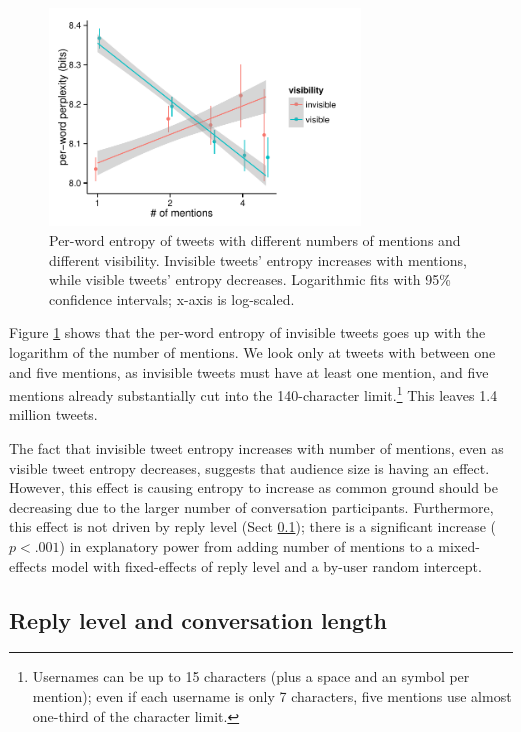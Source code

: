 \documentclass[11pt,letterpaper]{article}
\begin{document}
\begin{figure}[t]
 \centering
  \includegraphics[width=3.25in]{figures/cmcl-mentions-pw2.pdf}
 \caption{Per-word entropy of tweets with different numbers of mentions and different visibility.  Invisible tweets' entropy increases with mentions, while visible tweets' entropy decreases. Logarithmic fits with 95\% confidence intervals; x-axis is log-scaled.}\label{fig:mentions}\vspace*{-.5em}
\end{figure}

Figure \ref{fig:mentions} shows that the per-word entropy of invisible tweets goes up with the logarithm of the number of mentions.   We look only at tweets with between one and five mentions, as invisible tweets must have at least one mention, and five mentions already substantially cut into the 140-character limit.\footnote{Usernames can be up to 15 characters (plus a space and an \@ symbol per mention); even if each username is only 7 characters, five mentions use almost one-third of the character limit.}  This leaves 1.4 million tweets.

The fact that invisible tweet entropy increases with number of mentions, even as visible tweet entropy decreases, suggests that audience size is having an effect.  However, this effect is causing entropy to increase as common ground should be decreasing due to the larger number of conversation participants.  Furthermore, this effect is not driven by reply level (Sect \ref{sect:reply-level}); there is a significant increase ($p < .001$) in explanatory power from adding number of mentions to a mixed-effects model with fixed-effects of reply level and a by-user random intercept.

\subsection{Reply level and conversation length}\label{sect:reply-level}
\end{document}
